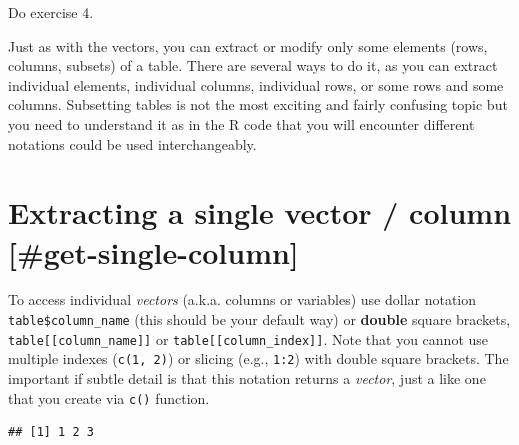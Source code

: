 \documentclass[
]{book}
\newenvironment{Shaded}{\begin{snugshade}}{\end{snugshade}}
\newcommand{\AttributeTok}[1]{\textcolor[rgb]{0.77,0.63,0.00}{#1}}
\newcommand{\CommentTok}[1]{\textcolor[rgb]{0.56,0.35,0.01}{\textit{#1}}}
\newcommand{\ConstantTok}[1]{\textcolor[rgb]{0.00,0.00,0.00}{#1}}
\newcommand{\DecValTok}[1]{\textcolor[rgb]{0.00,0.00,0.81}{#1}}
\newcommand{\FunctionTok}[1]{\textcolor[rgb]{0.00,0.00,0.00}{#1}}
\newcommand{\NormalTok}[1]{#1}
\newcommand{\OtherTok}[1]{\textcolor[rgb]{0.56,0.35,0.01}{#1}}
\newcommand{\SpecialCharTok}[1]{\textcolor[rgb]{0.00,0.00,0.00}{#1}}
\newcommand{\StringTok}[1]{\textcolor[rgb]{0.31,0.60,0.02}{#1}}
\begin{document}
Do exercise 4.

Just as with the vectors, you can extract or modify only some elements (rows, columns, subsets) of a table. There are several ways to do it, as you can extract individual elements, individual columns, individual rows, or some rows and some columns. Subsetting tables is not the most exciting and fairly confusing topic but you need to understand it as in the R code that you will encounter different notations could be used interchangeably.

\hypertarget{extracting-a-single-vector-column-get-single-column}{%
\section{Extracting a single vector / column {[}\#get-single-column{]}}\label{extracting-a-single-vector-column-get-single-column}}

To access individual \emph{vectors} (a.k.a. columns or variables) use dollar notation \texttt{table\$column\_name} (this should be your default way) or \textbf{double} square brackets, \texttt{table{[}{[}column\_name{]}{]}} or \texttt{table{[}{[}column\_index{]}{]}}. Note that you cannot use multiple indexes (\texttt{c(1,\ 2)}) or slicing (e.g., \texttt{1:2}) with double square brackets. The important if subtle detail is that this notation returns a \emph{vector}, just a like one that you create via \texttt{c()} function.

\begin{Shaded}
\end{Shaded}

\begin{verbatim}
## [1] 1 2 3
\end{verbatim}
\end{document}
